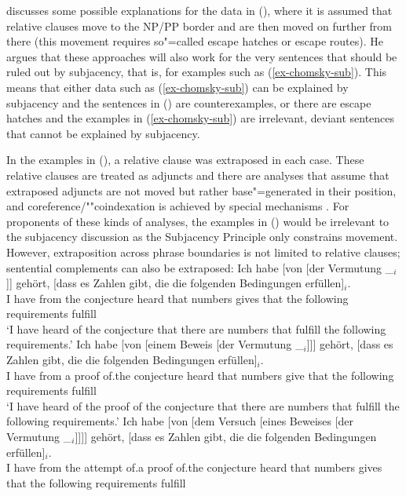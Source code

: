 \citet[--54]{Koster78b-u} discusses some possible explanations for the data in (), where it is assumed that relative clauses move to the NP/PP border and are then
moved on further from there (this movement requires so"=called escape hatches or escape routes). He argues that
these approaches will also work for the very sentences that should be ruled out by subjacency, that is, for examples such as (\ref{ex-chomsky-sub}). This means that either
data such as (\ref{ex-chomsky-sub}) can be explained by subjacency and the sentences in ()  are counterexamples, or there are escape hatches and the examples in
(\ref{ex-chomsky-sub}) are irrelevant, deviant sentences that cannot be explained by subjacency.

In the examples in (), a relative clause was extraposed in each case. These relative clauses
are treated as adjuncts and there are analyses that assume that extraposed adjuncts are not moved but rather base"=generated in their position,
and coreference/""coindexation is achieved by special mechanisms \citep{Kiss2005a}.
For proponents of these kinds of analyses, the examples in () would be irrelevant to the subjacency discussion as the Subjacency Principle
only constrains movement. However, extraposition across phrase boundaries is not limited to relative clauses; sentential complements can also be extraposed:
\eal
\ex 
\gll Ich habe [von [der Vermutung \_$_i$]] gehört, [dass es Zahlen gibt, die die folgenden Bedingungen erfüllen]$_i$.\\
	 I have \spacebr{}from \spacebr{}the conjecture {} heard \spacebr{}that \expl{} numbers gives that the following requirements fulfill\\
\glt `I have heard of the conjecture that there are numbers that fulfill the following requirements.'
\ex 
\gll Ich habe [von [einem Beweis [der Vermutung \_$_i$]]] gehört, [dass es Zahlen gibt, die die folgenden Bedingungen erfüllen]$_i$.\\
	I have \spacebr{}from \spacebr{}a proof \spacebr{}of.the conjecture {} heard \spacebr{}that \expl{} numbers give that the following requirements fulfill\\
\glt `I have heard of the proof of the conjecture that there are numbers that fulfill the following requirements.'
\ex 
\gll Ich habe [von [dem Versuch [eines Beweises [der Vermutung \_$_i$]]]] gehört, [dass es Zahlen gibt, die die folgenden Bedingungen erfüllen]$_i$.\\
     I have \spacebr{}from \spacebr{}the attempt \spacebr{}of.a proof \spacebr{}of.the conjecture {} heard \spacebr{}that \expl{} numbers gives that the following requirements fulfill\\
